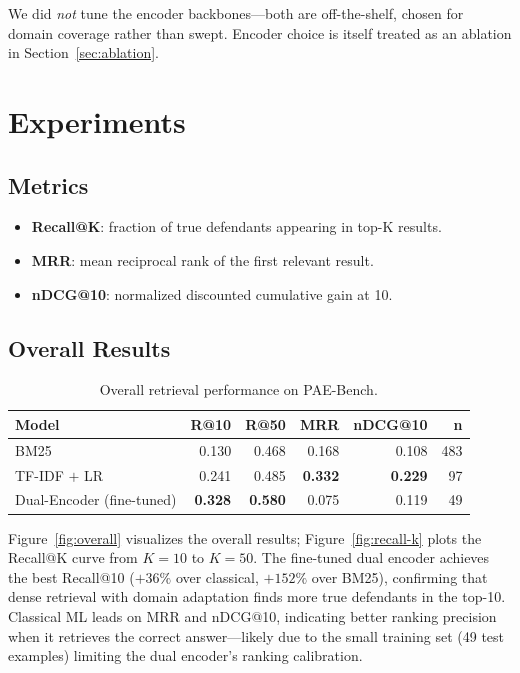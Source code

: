 \documentclass[11pt]{article}
\begin{document}
We did \emph{not} tune the encoder backbones---both are off-the-shelf, chosen for domain coverage rather than swept. Encoder choice is itself treated as an ablation in Section~\ref{sec:ablation}.

\section{Experiments}

\subsection{Metrics}

\begin{itemize}
    \item \textbf{Recall@K}: fraction of true defendants appearing in top-K results.
    \item \textbf{MRR}: mean reciprocal rank of the first relevant result.
    \item \textbf{nDCG@10}: normalized discounted cumulative gain at 10.
\end{itemize}

\subsection{Overall Results}

\begin{table}[h]
\centering
\caption{Overall retrieval performance on PAE-Bench.}
\label{tab:overall}
\begin{tabular}{lrrrrr}
\toprule
\textbf{Model} & \textbf{R@10} & \textbf{R@50} & \textbf{MRR} & \textbf{nDCG@10} & \textbf{n} \\
\midrule
BM25 & 0.130 & 0.468 & 0.168 & 0.108 & 483 \\
TF-IDF $+$ LR & 0.241 & 0.485 & \textbf{0.332} & \textbf{0.229} & 97 \\
Dual-Encoder (fine-tuned) & \textbf{0.328} & \textbf{0.580} & 0.075 & 0.119 & 49 \\
\bottomrule
\end{tabular}
\end{table}

Figure~\ref{fig:overall} visualizes the overall results; Figure~\ref{fig:recall-k} plots the Recall@K curve from $K{=}10$ to $K{=}50$. The fine-tuned dual encoder achieves the best Recall@10 ($+36\%$ over classical, $+152\%$ over BM25), confirming that dense retrieval with domain adaptation finds more true defendants in the top-10. Classical ML leads on MRR and nDCG@10, indicating better ranking precision when it retrieves the correct answer---likely due to the small training set (49 test examples) limiting the dual encoder's ranking calibration.
\end{document}

